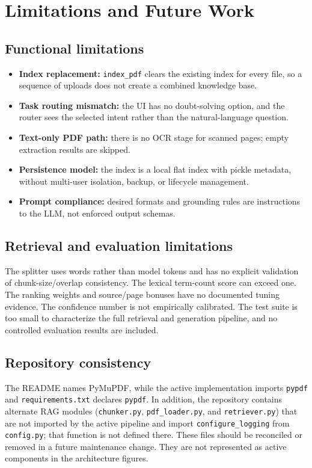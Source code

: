 \chapter{Limitations and Future Work}
\label{ch:limitations}

\section{Functional limitations}
\begin{itemize}
  \item \textbf{Index replacement:} \texttt{index\_pdf} clears the existing index for every file, so a sequence of uploads does not create a combined knowledge base.
  \item \textbf{Task routing mismatch:} the UI has no doubt-solving option, and the router sees the selected intent rather than the natural-language question.
  \item \textbf{Text-only PDF path:} there is no OCR stage for scanned pages; empty extraction results are skipped.
  \item \textbf{Persistence model:} the index is a local flat index with pickle metadata, without multi-user isolation, backup, or lifecycle management.
  \item \textbf{Prompt compliance:} desired formats and grounding rules are instructions to the LLM, not enforced output schemas.
\end{itemize}

\section{Retrieval and evaluation limitations}
The splitter uses words rather than model tokens and has no explicit validation of chunk-size/overlap consistency. The lexical term-count score can exceed one. The ranking weights and source/page bonuses have no documented tuning evidence. The confidence number is not empirically calibrated. The test suite is too small to characterize the full retrieval and generation pipeline, and no controlled evaluation results are included.

\section{Repository consistency}
The README names PyMuPDF, while the active implementation imports \texttt{pypdf} and \texttt{requirements.txt} declares \texttt{pypdf}. In addition, the repository contains alternate RAG modules (\texttt{chunker.py}, \texttt{pdf\_loader.py}, and \texttt{retriever.py}) that are not imported by the active pipeline and import \texttt{configure\_logging} from \texttt{config.py}; that function is not defined there. These files should be reconciled or removed in a future maintenance change. They are not represented as active components in the architecture figures.

